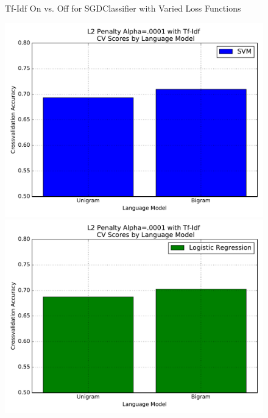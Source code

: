 \documentclass[a4paper, 12pt]{article}
\begin{document}
\begin{figure}[!htb]
\endminipage
\caption[Tf-Idf On vs. Off for SGDClassifier with Varied Loss Functions]{Tf-Idf On vs. Off for SGDClassifier with Varied Loss Functions}
\label{fig: tfidf}
\end{figure}


\begin{figure}[!htb]
  \includegraphics[width=\linewidth]{FiguresSVM_bigram_hinge.pdf}
\endminipage\hfill
{}
  \includegraphics[width=\linewidth]{FiguresSVM_bigram_log.pdf}
\endminipage\hfill
{}

\end{figure}
\end{document}
